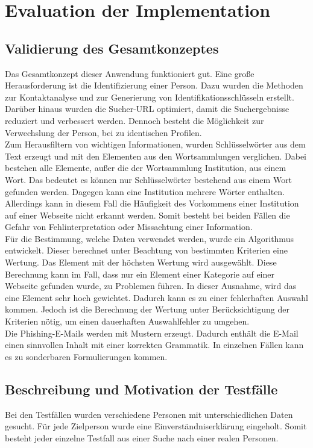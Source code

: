 

\chapter{Evaluation der Implementation}  %
\label{cha:Evaluation der Implementation} %
\section{Validierung des Gesamtkonzeptes}
Das Gesamtkonzept dieser Anwendung funktioniert gut. Eine große Herausforderung ist die Identifizierung einer Person. Dazu wurden die Methoden zur Kontaktanalyse und zur Generierung von Identifikationsschlüsseln erstellt. Darüber hinaus wurden die Sucher-URL optimiert, damit die Suchergebnisse reduziert und verbessert werden. Dennoch besteht die Möglichkeit zur Verwechslung der Person, bei zu identischen Profilen.\\
Zum Herausfiltern von wichtigen Informationen, wurden Schlüsselwörter aus dem Text erzeugt und mit den Elementen aus den Wortsammlungen verglichen. Dabei bestehen alle Elemente, außer die der Wortsammlung Institution, aus einem Wort. Das bedeutet es können nur Schlüsselwörter bestehend aus einem Wort gefunden werden. Dagegen kann eine Institution mehrere Wörter enthalten. Allerdings kann in diesem Fall die Häufigkeit des Vorkommens einer Institution auf einer Webseite nicht erkannt werden. Somit besteht bei beiden Fällen die Gefahr von Fehlinterpretation oder Missachtung einer Information.\\
Für die Bestimmung, welche Daten verwendet werden, wurde ein Algorithmus entwickelt. Dieser berechnet unter Beachtung von bestimmten Kriterien eine Wertung. Das Element mit der höchsten Wertung wird ausgewählt. Diese Berechnung kann im Fall, dass nur ein Element einer Kategorie auf einer Webseite gefunden wurde, zu Problemen führen. In dieser Ausnahme, wird das eine Element sehr hoch gewichtet. Dadurch kann es zu einer fehlerhaften Auswahl kommen. Jedoch ist die Berechnung der Wertung unter Berücksichtigung der Kriterien nötig, um einen dauerhaften Auswahlfehler zu umgehen.\\
Die Phishing-E-Mails werden mit Mustern erzeugt. Dadurch enthält die E-Mail einen sinnvollen Inhalt mit einer korrekten Grammatik. In einzelnen Fällen kann es zu sonderbaren Formulierungen kommen.

\section{Beschreibung und Motivation der Testfälle}
Bei den Testfällen wurden verschiedene Personen mit unterschiedlichen Daten gesucht. Für jede Zielperson wurde eine Einverständniserklärung eingeholt. Somit besteht jeder einzelne Testfall aus einer Suche nach einer realen Personen.
